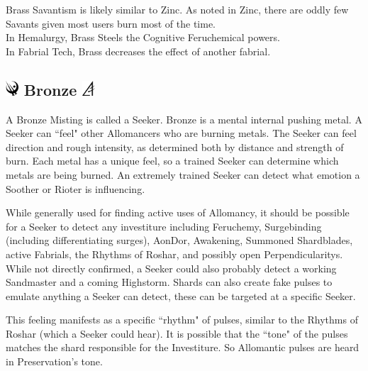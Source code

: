 \documentclass[conference]{IEEEtran}
\begin{document}
Brass Savantism is likely similar to Zinc.  As noted in Zinc, there are oddly few Savants given most users burn most of the time.\cite{WoA-CH11} \\

In Hemalurgy, Brass Steels the Cognitive Feruchemical powers.\cite{HE-TB}\\

In Fabrial Tech, Brass decreases the effect of another fabrial.\cite{RoW-E7} 
\subsection*{\includegraphics[height=1em]{images/Bronze.png}  Bronze \includegraphics[height=1em]{images/Bronze_(Feruchemy).png}}
A Bronze Misting is called a Seeker.\cite{ARS}  Bronze is a mental internal pushing metal. \cite{AL-TB}
A Seeker can ``feel" other Allomancers who are burning metals.\cite{ARS}  The Seeker can feel direction and rough intensity, as determined both by distance and strength of burn.\cite{TFE-CH20}  Each metal has a unique feel, so a trained Seeker can determine which metals are being burned.  An extremely trained Seeker can detect what emotion a Soother or Rioter is influencing. \cite{TFE-CH20}

While generally used for finding active uses of Allomancy, it should be possible for a Seeker to detect any investiture\cite{seek-univeral} including Feruchemy,\cite{seek-FE} Surgebinding (including differentiating surges),\cite{seek-surge} AonDor,\cite{seek-aone} Awakening,\cite{seek-aone} Summoned Shardblades,\cite{seek-shard} active Fabrials,\cite{OB-CH69}\cite{seeker-spren} the Rhythms of Roshar,\cite{seek-rythem} and possibly open Perpendicularitys\cite{HoA-CH37}.  While not directly confirmed, a Seeker could also probably detect a working Sandmaster and a coming Highstorm.  Shards can also create fake pulses to emulate anything a Seeker can detect,\cite{HoA-CH37}\cite{HoA-CH38} these can be targeted at a specific Seeker.\cite{HoA-CH38}

This feeling manifests as a specific ``rhythm" of pulses,\cite{TFE-CH20} similar to the Rhythms of Roshar (which a Seeker could hear)\cite{listner-seeker}.\cite{seek-rythem}  It is possible that the ``tone" of the pulses matches the shard responsible for the Investiture.\cite{shard-lengh}\cite{pure-tone}  So Allomantic pulses are heard in Preservation's tone.
\end{document}
